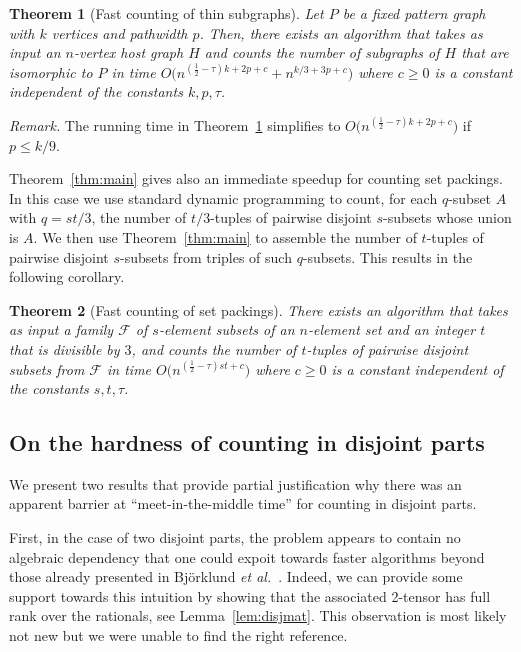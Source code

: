 \documentclass{amsart}
\newtheorem{Thm}{Theorem}
\begin{document}
\begin{Thm}[Fast counting of thin subgraphs]
\label{thm:subgraph}
Let $P$ be a fixed pattern graph with $k$ vertices and pathwidth $p$. 
Then, there exists an algorithm that takes as input an $n$-vertex
host graph $H$ and counts the number of subgraphs of $H$ that are 
isomorphic to $P$ in time 
$O\bigl(n^{(\frac{1}{2}-\tau)k+2p+c}+n^{k/3+3p+c}\bigr)$
where $c\geq 0$ is a constant independent of the constants $k,p,\tau$.
\end{Thm}

\noindent
{\em Remark.} The running time in Theorem~\ref{thm:subgraph} 
simplifies to $O\bigl(n^{(\frac{1}{2}-\tau)k+2p+c}\bigr)$ if $p\leq k/9$.

\medskip
Theorem~\ref{thm:main} gives also an immediate speedup for counting set 
packings. In this case we use standard dynamic programming to count, 
for each $q$-subset $A$ with $q=st/3$, the number of $t/3$-tuples of 
pairwise disjoint $s$-subsets whose union is $A$. 
We then use Theorem~\ref{thm:main} to 
assemble the number of $t$-tuples of pairwise disjoint $s$-subsets
from triples of such $q$-subsets. This results in the following corollary.

\begin{Thm}[Fast counting of set packings]
\label{thm:packings}
There exists an algorithm that takes as input 
a family $\mathcal{F}$ of $s$-element subsets of an $n$-element 
set and an integer $t$ that is divisible by $3$, 
and counts the number of $t$-tuples of pairwise disjoint subsets
from $\mathcal{F}$ in time $O\bigl(n^{(\frac{1}{2}-\tau)st+c}\bigr)$
where $c\geq 0$ is a constant independent of the constants $s,t,\tau$.
\end{Thm}

\subsection{On the hardness of counting in disjoint parts}

We present two results that provide partial
justification why there was an apparent barrier 
at ``meet-in-the-middle time'' for counting in disjoint parts. 

First, in the case of two disjoint parts, the problem appears to
contain no algebraic dependency that one could expoit towards
faster algorithms beyond those already presented in 
Bj\"orklund {\em et al.}~\cite{BHKK08,BHKK09}. Indeed, we can
provide some support towards this intuition by showing that
the associated 2-tensor has full rank over the rationals, see Lemma~\ref{lem:disjmat}.
This observation is most likely not new but we were unable to find the right reference.
\end{document}
